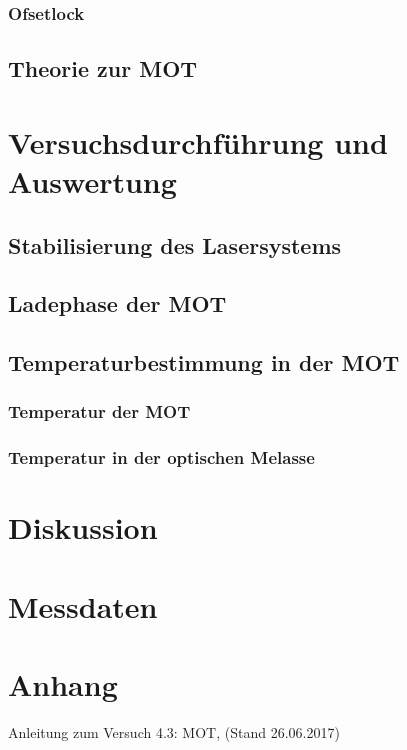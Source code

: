\documentclass[twoside,colorback,accentcolor=tud4c,11pt]{tudreport}
\begin{document}
\subsection{Ofsetlock}
\section{Theorie zur MOT}\label{theorie} 	
\chapter{Versuchsdurchführung und Auswertung}
\section{Stabilisierung des Lasersystems}
\section{Ladephase der MOT}
\section{Temperaturbestimmung in der MOT}
\subsection{Temperatur der MOT}
\subsection{Temperatur in der optischen Melasse}
\chapter{Diskussion}
\chapter{Messdaten}


\chapter{Anhang}





		

\renewcommand{\bibname}{Literaturverzeichnis}
\begin{thebibliography}{Bak89}
 Anleitung zum Versuch 4.3: MOT, (Stand 26.06.2017)


\end{thebibliography} 	
\end{document}
